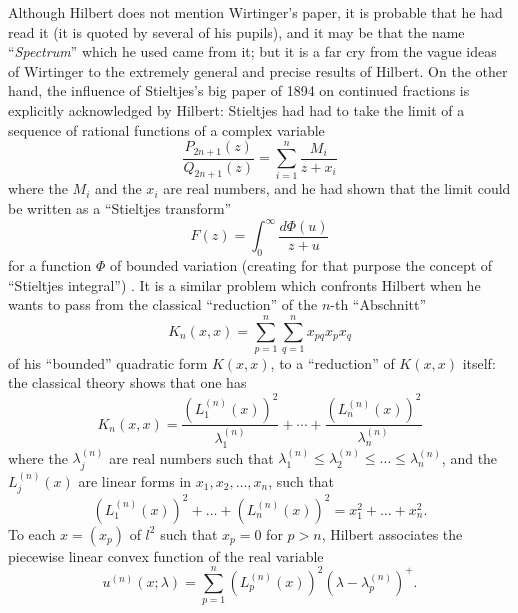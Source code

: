 \documentclass[12pt,a4paper,leqno,twoside]{extbook}
\begin{document}
Although Hilbert does not mention Wirtinger's paper, it is probable that he had read it (it is quoted by several of his pupils), and it may be that the name ``\emph{Spectrum}'' which he used came from it; but it is a far cry from the vague ideas of Wirtinger to the extremely general and precise results of Hilbert. On the other hand, the influence of Stieltjes's big paper of 1894 on continued fractions is explicitly acknowledged by Hilbert: Stieltjes had had to take the limit of a sequence of rational functions of a complex variable
\[
    \frac{P_{2n+1}(z)}{Q_{2n+1}(z)} = \sum_{i=1}^n \frac{M_i}{z + x_i}
\]
where the \(M_i\) and the \(x_i\) are real numbers, and he had shown that the limit could be written as a ``Stieltjes transform''
\[
    F(z) = \int_0^\infty \frac{d\Phi(u)}{z+u}
\]
for a function \(\Phi\) of bounded variation (creating for that purpose the concept of ``Stieltjes integral'') \cite{205}. It is a similar problem which confronts Hilbert when he wants to pass from the classical ``reduction'' of the \(n\)-th ``Abschnitt''
\begin{equation}
    \label{eq:7.4}
    K_n(x, x) = \sum_{p=1}^n \sum_{q=1}^n x_{pq} x_p x_q
\end{equation}
of his ``bounded'' quadratic form \(K(x,x)\), to a ``reduction'' of \(K(x,x)\) itself: the classical theory shows that one has
\begin{equation}
    \label{eq:7.5}
    K_n(x, x) = \frac{\left( L_1^{(n)}(x) \right)^2}{\lambda_1^{(n)}} + \cdots + \frac{\left( L_n^{(n)}(x) \right)^2}{\lambda_n^{(n)}}
\end{equation}
where the \(\lambda_j^{(n)}\) are real numbers such that \(\lambda_1^{(n)} \leq \lambda_2^{(n)} \leq \ldots \leq \lambda_n^{(n)}\), and the \(L_j^{(n)}(x)\) are linear forms in \(x_1, x_2, \ldots, x_n\), such that
\begin{equation}
    \label{eq:7.6}
    \left( L_1^{(n)}(x) \right)^2 + \ldots + \left( L_n^{(n)}(x) \right)^2 = x_1^2 + \ldots + x_n^2.
\end{equation}
To each \(x = (x_p)\) of \(l^2\) such that \(x_p=0\) for \(p > n\), Hilbert associates the piecewise linear convex function of the real variable
\begin{equation}
    \label{eq:7.7}
    u^{(n)}(x; \lambda) = \sum_{p=1}^n \left( L_p^{(n)}(x) \right)^2 \left(\lambda - \lambda_p^{(n)}\right)^+.
\end{equation}
\end{document}
